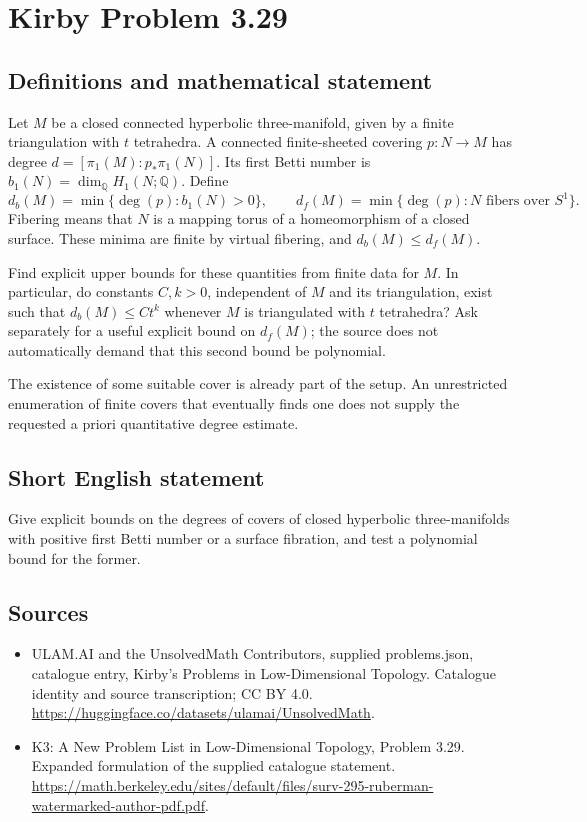 \documentclass[11pt,a4paper]{article}
\begin{document}
\section*{Kirby Problem 3.29}\label{statement}

\subsection{Definitions and mathematical statement}
Let $M$ be a closed connected hyperbolic three-manifold, given by a finite
triangulation with $t$ tetrahedra. A connected finite-sheeted covering
$p:N\to M$ has degree $d=[\pi_1(M):p_*\pi_1(N)]$. Its first Betti number is
$b_1(N)=\dim_{\mathbb Q}H_1(N;\mathbb Q)$.
Define
\[
 d_b(M)=\min\{\deg(p):b_1(N)>0\},\qquad
 d_f(M)=\min\{\deg(p):N\text{ fibers over }S^1\}.
\]
Fibering means that $N$ is a mapping torus of a homeomorphism of a closed
surface. These minima are finite by virtual fibering, and
$d_b(M)\leq d_f(M)$.

Find explicit upper bounds for these quantities from finite data for $M$.
In particular, do constants $C,k>0$, independent of $M$ and its triangulation,
exist such that $d_b(M)\leq Ct^k$ whenever $M$ is triangulated with $t$
tetrahedra? Ask separately for a useful explicit bound on $d_f(M)$; the source
does not automatically demand that this second bound be polynomial.

The existence of some suitable cover is already part of the setup. An
unrestricted enumeration of finite covers that eventually finds one does not
supply the requested a priori quantitative degree estimate.
\subsection{Short English statement}
Give explicit bounds on the degrees of covers of closed hyperbolic three-manifolds with positive first Betti number or a surface fibration, and test a polynomial bound for the former.
\subsection{Sources}
\begin{itemize}
\item[S1] ULAM.AI and the UnsolvedMath Contributors, supplied problems.json, catalogue entry, Kirby's Problems in Low-Dimensional Topology. Catalogue identity and source transcription; CC BY 4.0.
\url{https://huggingface.co/datasets/ulamai/UnsolvedMath}.
\item[S2] K3: A New Problem List in Low-Dimensional Topology, Problem 3.29. Expanded formulation of the supplied catalogue statement.
\url{https://math.berkeley.edu/sites/default/files/surv-295-ruberman-watermarked-author-pdf.pdf}.
\end{itemize}
\end{document}
